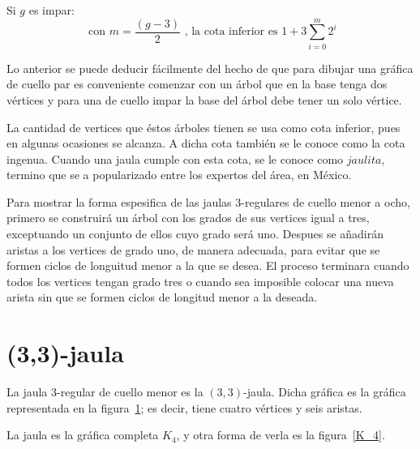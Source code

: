 \documentclass[12pt]{book}
\theoremstyle{definition}
\begin{document}
Si $g$ es impar:
\begin{equation*}
  \text{ con } m=\frac{(g-3)}{2} \text{ , la cota inferior es } 1 + 3\sum^m_{i=0} 2^i
\end{equation*}

Lo anterior se puede deducir fácilmente del hecho de que para dibujar
una gráfica de cuello par es conveniente comenzar con un árbol que en
la base tenga dos vértices y para una de cuello impar la base del
árbol debe tener un solo vértice. 

La cantidad de vertices que éstos
árboles tienen se usa como cota inferior, pues en algunas ocasiones se alcanza.
A dicha cota también se le conoce como la cota ingenua. Cuando una jaula cumple con esta cota, se le conoce como
$jaulita$, termino que se a popularizado entre los
expertos del área, en México.


Para mostrar la forma espesifica de las jaulas $3$-regulares de cuello
menor a ocho, primero se construirá un árbol con los grados de sus
vertices igual a tres, exceptuando un conjunto de ellos cuyo grado será uno. 
Despues se añadirán aristas a los vertices de grado uno, de manera
adecuada, para evitar que se formen ciclos de longuitud menor a la que
se desea. El proceso terminara cuando todos los vertices tengan grado
tres o cuando sea imposible colocar una nueva arista sin que se formen
ciclos de longitud menor a la deseada.


\section{(3,3)-jaula}

La jaula $3$-regular de cuello menor es la $(3,3)$-jaula. Dicha gráfica es la gráfica representada en la figura~\ref{jaula(3,3)}; es decir, tiene cuatro vértices y seis aristas.

\begin{figure}[htb]
  \centering
  \caption{} \label{jaula(3,3)}
\end{figure}

La jaula es la gráfica completa $K_4$, y otra forma de verla es la figura~\ref{K_4}.
\end{document}
